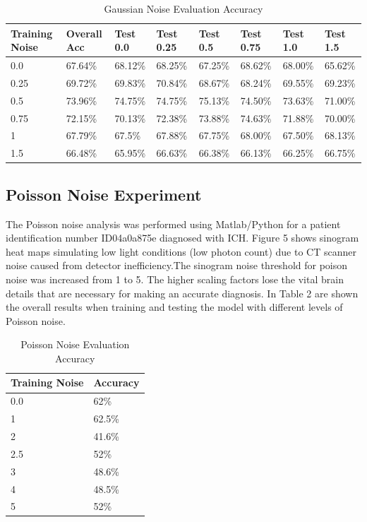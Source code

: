 \documentclass{article}
\begin{document}
\vspace{0.5cm}
\begin{table}[h]
    \centering
    \caption{Gaussian Noise Evaluation Accuracy}
    \begin{tabular}{@{}llllllll@{}}
        \toprule
        Training Noise & Overall Acc & Test 0.0 & Test 0.25 & Test 0.5 & Test 0.75 & Test 1.0 & Test 1.5 \\
        \midrule
        0.0 & 67.64\% & 68.12\% & 68.25\% & 67.25\% & 68.62\% & 68.00\% & 65.62\% \\
        \midrule
        0.25 & 69.72\% & 69.83\% & 70.84\% & 68.67\% & 68.24\% & 69.55\% & 69.23\% \\
        \midrule
        0.5 & 73.96\% & 74.75\% & 74.75\% & 75.13\% & 74.50\% & 73.63\% & 71.00\% \\
        \midrule
        0.75 & 72.15\% & 70.13\% & 72.38\% & 73.88\% & 74.63\% & 71.88\% & 70.00\%\\
        \midrule
        1 & 67.79\% & 67.5\% & 67.88\% & 67.75\% & 68.00\% & 67.50\% & 68.13\% \\
        \midrule
        1.5 & 66.48\% & 65.95\% & 66.63\% & 66.38\% & 66.13\% & 66.25\% & 66.75\% \\
        \bottomrule
    \end{tabular}
\end{table}

\subsection{Poisson Noise Experiment}
\begin{par}
    The Poisson noise analysis was performed using Matlab/Python for a patient identification number ID04a0a875e diagnosed with ICH. Figure 5 shows sinogram heat maps simulating low light conditions (low photon count) due to CT scanner noise caused from detector inefficiency.The sinogram noise threshold for poison noise was increased from 1 to 5. The higher scaling factors lose the vital brain details that are necessary for making an accurate diagnosis.  
    In Table 2 are shown the overall results when training and testing the model with different levels of Poisson noise. 
\end{par}

\begin{table}[h]
    \centering
    \caption{Poisson Noise Evaluation Accuracy} 
    \begin{tabular}{@{}ll@{}}
        \toprule
        Training Noise & Accuracy \\
        \midrule
        0.0 & 62\% \\
        \midrule
        1 & 62.5\% \\
        \midrule
        2 & 41.6\% \\
        \midrule
        2.5 & 52\% \\
        \midrule
        3 & 48.6\% \\
        \midrule
        4 & 48.5\% \\
        \midrule
        5 & 52\% \\
        \bottomrule
    \end{tabular}
\end{table}
\end{document}
